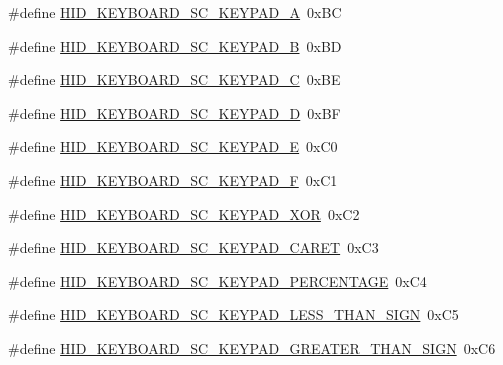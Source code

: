 \begin{DoxyCompactItemize}
\item 
\#define \hyperlink{group__Group__USBClassHIDCommon_gae014158bbf79ba3dc1f09ed8c810bee2}{H\+I\+D\+\_\+\+K\+E\+Y\+B\+O\+A\+R\+D\+\_\+\+S\+C\+\_\+\+K\+E\+Y\+P\+A\+D\+\_\+A}~0x\+BC
\item 
\#define \hyperlink{group__Group__USBClassHIDCommon_gacbb8fbd90972e719db54fba254be6361}{H\+I\+D\+\_\+\+K\+E\+Y\+B\+O\+A\+R\+D\+\_\+\+S\+C\+\_\+\+K\+E\+Y\+P\+A\+D\+\_\+B}~0x\+BD
\item 
\#define \hyperlink{group__Group__USBClassHIDCommon_gac4a541f487ee8df19d385ab3e8d72c9a}{H\+I\+D\+\_\+\+K\+E\+Y\+B\+O\+A\+R\+D\+\_\+\+S\+C\+\_\+\+K\+E\+Y\+P\+A\+D\+\_\+C}~0x\+BE
\item 
\#define \hyperlink{group__Group__USBClassHIDCommon_ga946df6812a6b179e34a07c09226b74e7}{H\+I\+D\+\_\+\+K\+E\+Y\+B\+O\+A\+R\+D\+\_\+\+S\+C\+\_\+\+K\+E\+Y\+P\+A\+D\+\_\+D}~0x\+BF
\item 
\#define \hyperlink{group__Group__USBClassHIDCommon_gaa67622f746b71d1829fd9c383d7ba64d}{H\+I\+D\+\_\+\+K\+E\+Y\+B\+O\+A\+R\+D\+\_\+\+S\+C\+\_\+\+K\+E\+Y\+P\+A\+D\+\_\+E}~0x\+C0
\item 
\#define \hyperlink{group__Group__USBClassHIDCommon_ga9224b26cb95128758da970f87a31de01}{H\+I\+D\+\_\+\+K\+E\+Y\+B\+O\+A\+R\+D\+\_\+\+S\+C\+\_\+\+K\+E\+Y\+P\+A\+D\+\_\+F}~0x\+C1
\item 
\#define \hyperlink{group__Group__USBClassHIDCommon_ga4d08ea3d4d390aa15410e9c2220e4a77}{H\+I\+D\+\_\+\+K\+E\+Y\+B\+O\+A\+R\+D\+\_\+\+S\+C\+\_\+\+K\+E\+Y\+P\+A\+D\+\_\+\+X\+OR}~0x\+C2
\item 
\#define \hyperlink{group__Group__USBClassHIDCommon_gaf1f3fc8e04e7be40b813a09b1992d8a7}{H\+I\+D\+\_\+\+K\+E\+Y\+B\+O\+A\+R\+D\+\_\+\+S\+C\+\_\+\+K\+E\+Y\+P\+A\+D\+\_\+\+C\+A\+R\+ET}~0x\+C3
\item 
\#define \hyperlink{group__Group__USBClassHIDCommon_gaf320f9fcb16108e975c4279c1b773de0}{H\+I\+D\+\_\+\+K\+E\+Y\+B\+O\+A\+R\+D\+\_\+\+S\+C\+\_\+\+K\+E\+Y\+P\+A\+D\+\_\+\+P\+E\+R\+C\+E\+N\+T\+A\+GE}~0x\+C4
\item 
\#define \hyperlink{group__Group__USBClassHIDCommon_gafeaca7eb50911ad62645af4fc5c278e0}{H\+I\+D\+\_\+\+K\+E\+Y\+B\+O\+A\+R\+D\+\_\+\+S\+C\+\_\+\+K\+E\+Y\+P\+A\+D\+\_\+\+L\+E\+S\+S\+\_\+\+T\+H\+A\+N\+\_\+\+S\+I\+GN}~0x\+C5
\item 
\#define \hyperlink{group__Group__USBClassHIDCommon_ga9e8454cf917554067f48bf4bf4b18945}{H\+I\+D\+\_\+\+K\+E\+Y\+B\+O\+A\+R\+D\+\_\+\+S\+C\+\_\+\+K\+E\+Y\+P\+A\+D\+\_\+\+G\+R\+E\+A\+T\+E\+R\+\_\+\+T\+H\+A\+N\+\_\+\+S\+I\+GN}~0x\+C6

\end{DoxyCompactItemize}
